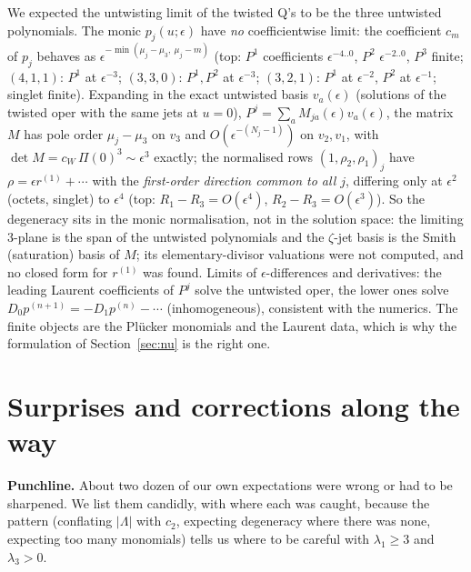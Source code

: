 \documentclass[11pt]{article}
\begin{document}
We expected the untwisting limit of the twisted Q's to be the three untwisted polynomials.
The monic $p_j(u;\epsilon)$ have \emph{no} coefficientwise limit: the coefficient $c_m$ of $p_j$ behaves as $\epsilon^{-\min(\mu_j-\mu_3,\ \mu_j-m)}$ (top: $P^1$ coefficients $\epsilon^{-4..0}$, $P^2$ $\epsilon^{-2..0}$, $P^3$ finite; $(4,1,1)$: $P^1$ at $\epsilon^{-3}$; $(3,3,0)$: $P^1,P^2$ at $\epsilon^{-3}$; $(3,2,1)$: $P^1$ at $\epsilon^{-2}$, $P^2$ at $\epsilon^{-1}$; singlet finite).
Expanding in the exact untwisted basis $v_a(\epsilon)$ (solutions of the twisted oper with the same jets at $u=0$), $P^j=\sum_aM_{ja}(\epsilon)v_a(\epsilon)$, the matrix $M$ has pole order $\mu_j-\mu_3$ on $v_3$ and $O(\epsilon^{-(N_j-1)})$ on $v_2,v_1$, with $\det M=c_W\,\Pi(0)^3\sim\epsilon^3$ exactly; the normalised rows $(1,\rho_2,\rho_1)_j$ have $\rho=\epsilon r^{(1)}+\cdots$ with the \emph{first-order direction common to all $j$}, differing only at $\epsilon^2$ (octets, singlet) to $\epsilon^4$ (top: $R_1-R_3=O(\epsilon^4)$, $R_2-R_3=O(\epsilon^3)$).
So the degeneracy sits in the monic normalisation, not in the solution space: the limiting 3-plane is the span of the untwisted polynomials and the $\zeta$-jet basis is the Smith (saturation) basis of $M$; its elementary-divisor valuations were not computed, and no closed form for $r^{(1)}$ was found.
Limits of $\epsilon$-differences and derivatives: the leading Laurent coefficients of $P^j$ solve the untwisted oper, the lower ones solve $D_0p^{(n+1)}=-D_1p^{(n)}-\cdots$ (inhomogeneous), consistent with the numerics.
The finite objects are the Plücker monomials and the Laurent data, which is why the formulation of Section~\ref{sec:nu} is the right one.

\section{Surprises and corrections along the way}\label{sec:surprises}

\textbf{Punchline.} About two dozen of our own expectations were wrong or had to be sharpened.
We list them candidly, with where each was caught, because the pattern (conflating $|\Lambda|$ with $c_2$, expecting degeneracy where there was none, expecting too many monomials) tells us where to be careful with $\lambda_1\ge3$ and $\lambda_3>0$.
\end{document}
